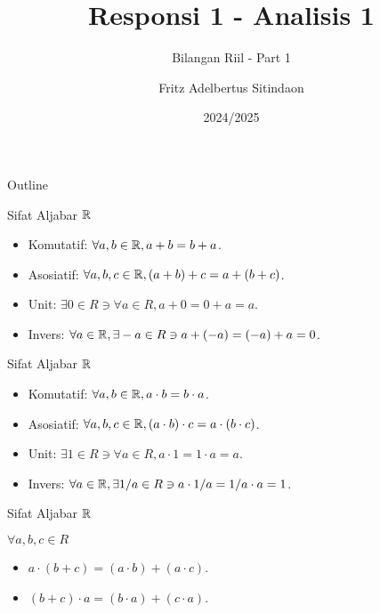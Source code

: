 \documentclass{beamer}
\title{Responsi 1 - Analisis 1}
\subtitle{Bilangan Riil - Part 1}
\date[]{2024/2025}
\author[Fritz]{Fritz Adelbertus Sitindaon}
\begin{document}
\begin{frame}
\titlepage
\end{frame}

\begin{frame}{Outline}
    \tableofcontents
\end{frame}

\begin{frame}{Sifat Aljabar $\mathbb{R}$}
    \begin{tcolorbox}[enhanced,title=Penjumlahan, frame style tile={width=\paperwidth}{\wallpaper}]
        \begin{itemize}
            \item Komutatif: $\forall a,b \in \mathbb{R}, a+b=b+a$.
            \item Asosiatif: $\forall a,b,c \in \mathbb{R}, (a+b)+c=a+(b+c)$.
            \item Unit: $\exists 0 \in R \ni \forall a \in R, a+0=0+a=a$.
            \item Invers: $\forall a \in \mathbb{R}, \exists -a \in R \ni a + (-a) = (-a) + a = 0$.
        \end{itemize}
    \end{tcolorbox}
\end{frame}

\begin{frame}{Sifat Aljabar $\mathbb{R}$}
    \begin{tcolorbox}[enhanced,title=Perkalian, frame style tile={width=\paperwidth}{\wallpaper}]
        \begin{itemize}
            \item Komutatif: $\forall a,b \in \mathbb{R}, a \cdot b=b \cdot a$.
            \item Asosiatif: $\forall a,b,c \in \mathbb{R}, (a \cdot b) \cdot c=a \cdot (b \cdot c)$.
            \item Unit: $\exists 1 \in R \ni \forall a \in R, a \cdot 1=1 \cdot a=a$.
            \item Invers: $\forall a \in \mathbb{R}, \exists 1/a \in R \ni a \cdot 1/a = 1/a \cdot a = 1$.
        \end{itemize}
    \end{tcolorbox}
\end{frame}

\begin{frame}{Sifat Aljabar $\mathbb{R}$}
    \begin{tcolorbox}[enhanced,title=Distributif, frame style tile={width=\paperwidth}{\wallpaper}]
        $\forall a,b,c \in R$
        \begin{itemize}
            \item $a \cdot (b+c) = (a \cdot b) + (a \cdot c)$.
            \item $(b+c) \cdot a = (b \cdot a) + (c \cdot a)$.
        \end{itemize}
    \end{tcolorbox}
\end{frame}
\end{document}
